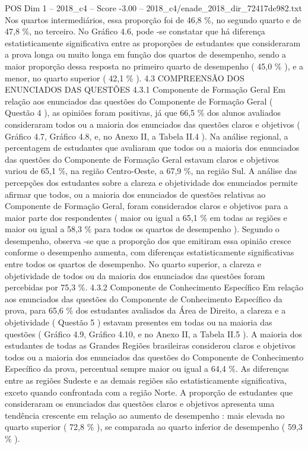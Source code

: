 \begin{textsample}{POS Dim 1 – 2018\_c4 – Score -3.00 – 2018\_c4/enade\_2018\_dir\_72417de982.txt}
Nos quartos intermediários, essa proporção foi de 46,8 \%, no segundo quarto e de 47,8 \%, no terceiro.
No Gráfico 4.6, pode -se constatar que há diferença estatisticamente significativa entre as proporções de estudantes que consideraram a prova longa ou muito longa em função dos quartos de desempenho, sendo a maior proporção dessa resposta no primeiro quarto de desempenho ( 45,0 \% ), e a menor, no quarto superior ( 42,1 \% ). 4.3 COMPREENSÃO DOS ENUNCIADOS DAS QUESTÕES 4.3.1 Componente de Formação Geral Em relação aos enunciados das questões do Componente de Formação Geral ( Questão 4 ), as opiniões foram positivas, já que 66,5 \% dos alunos avaliados consideraram todos ou a maioria dos enunciados das questões claros e objetivos ( Gráfico 4.7, Gráfico 4.8, e, no Anexo II, a Tabela II.4 ).
Na análise regional, a percentagem de estudantes que avaliaram que todos ou a maioria dos enunciados das questões do Componente de Formação Geral estavam claros e objetivos variou de 65,1 \%, na região Centro-Oeste, a 67,9 \%, na região Sul.
A análise das percepções dos estudantes sobre a clareza e objetividade dos enunciados permite afirmar que todos, ou a maioria dos enunciados de questões relativas ao Componente de Formação Geral, foram considerados claros e objetivos para a maior parte dos respondentes ( maior ou igual a 65,1 \% em todas as regiões e maior ou igual a 58,3 \% para todos os quartos de desempenho ).
Segundo o desempenho, observa -se que a proporção dos que emitiram essa opinião cresce conforme o desempenho aumenta, com diferenças estatisticamente significativas entre todos os quartos de desempenho.
No quarto superior, a clareza e objetividade de todos ou da maioria dos enunciados das questões foram percebidas por 75,3 \%. 4.3.2 Componente de Conhecimento Específico Em relação aos enunciados das questões do Componente de Conhecimento Específico da prova, para 65,6 \% dos estudantes avaliados da Área de Direito, a clareza e a objetividade ( Questão 5 ) estavam presentes em todas ou na maioria das questões ( Gráfico 4.9, Gráfico 4.10, e no Anexo II, a Tabela II.5 ).
A maioria dos estudantes de todas as Grandes Regiões brasileiras considerou claros e objetivos todos ou a maioria dos enunciados das questões do Componente de Conhecimento Específico da prova, percentual sempre maior ou igual a 64,4 \%.
As diferenças entre as regiões Sudeste e as demais regiões são estatisticamente significativa, exceto quando confrontada com a região Norte.
A proporção de estudantes que consideraram os enunciados das questões claros e objetivos apresenta uma tendência crescente em relação ao aumento de desempenho : mais elevada no quarto superior ( 72,8 \% ), se comparada ao quarto inferior de desempenho ( 59,3 \% ).

\end{textsample}
